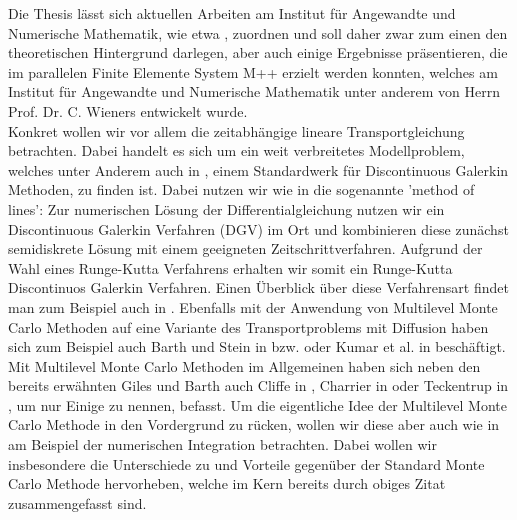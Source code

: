 Die Thesis lässt sich aktuellen Arbeiten am Institut für Angewandte und Numerische Mathematik, wie etwa \cite{BAUMGARTEN2020}, zuordnen und soll daher zwar zum einen den theoretischen Hintergrund darlegen, aber auch einige Ergebnisse präsentieren, die im parallelen Finite Elemente System M++ \cite{siteM++} erzielt werden konnten, welches am Institut für Angewandte und Numerische Mathematik unter anderem von Herrn Prof. Dr. C. Wieners entwickelt wurde. \\
Konkret wollen wir vor allem die zeitabhängige lineare Transportgleichung betrachten. Dabei handelt es sich um ein weit verbreitetes Modellproblem, welches unter Anderem auch in \cite{di2011mathematical}, einem Standardwerk für Discontinuous Galerkin Methoden, zu finden ist. 
Dabei nutzen wir wie in \cite{di2011mathematical} die sogenannte 'method of lines': Zur numerischen Lösung der Differentialgleichung nutzen wir ein Discontinuous Galerkin Verfahren (DGV) im Ort und kombinieren diese zunächst semidiskrete Lösung mit einem geeigneten Zeitschrittverfahren. Aufgrund der Wahl eines Runge-Kutta Verfahrens erhalten wir somit ein Runge-Kutta Discontinuos Galerkin Verfahren. Einen Überblick über diese Verfahrensart findet man zum Beispiel auch in \cite{cockburn2001runge}.
Ebenfalls mit der Anwendung von Multilevel Monte Carlo Methoden auf eine Variante des Transportproblems mit Diffusion haben sich zum Beispiel auch Barth und Stein in \cite{barth2013multilevel} bzw. \cite{barth2019multilevel} oder Kumar et al. in \cite{kumar2018multigrid} beschäftigt. Mit Multilevel Monte Carlo Methoden im Allgemeinen haben sich neben den bereits erwähnten Giles und Barth auch Cliffe in \cite{cliffe2011multilevel}, Charrier in \cite{charrier2012strong} oder Teckentrup in \cite{teckentrup2013further}, um nur Einige zu nennen, befasst.
Um die eigentliche Idee der Multilevel Monte Carlo Methode in den Vordergrund zu rücken, wollen wir diese aber auch wie in \cite{heinrich2001multilevel} am Beispiel der numerischen Integration betrachten.
Dabei wollen wir insbesondere die Unterschiede zu und Vorteile gegenüber der Standard Monte Carlo Methode hervorheben, welche im Kern bereits durch obiges Zitat zusammengefasst sind.

